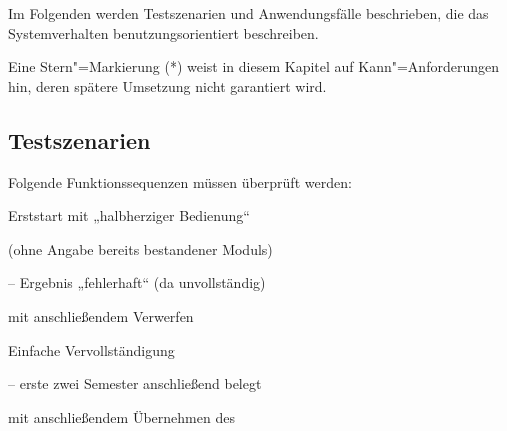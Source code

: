 \newenvironment{tblitemize}{
	\begin{itemize}[nosep,leftmargin=12pt]
}{
	\end{itemize}\hspace{0pt}\vspace{-\baselineskip}
}

\newcommand{\lA}[1]{\label{A#1}A#1}

\newcommand{\refA}[1]{\hyperref[A#1]{/A#1/}}

\newcommand{\opt}{*} 

\newcommand{\case}[1]{\textit{#1}}


Im Folgenden werden Testszenarien und Anwendungsfälle beschrieben, die das Systemverhalten benutzungsorientiert beschreiben.

Eine Stern"=Markierung (\opt) weist in diesem Kapitel auf Kann"=Anforderungen hin, deren spätere Umsetzung nicht garantiert wird.

\subsection{Testszenarien}
Folgende Funktionssequenzen müssen überprüft werden:

\begin{scenario}{Erststart mit „halbherziger Bedienung“}
	\item {} (ohne Angabe bereits bestandener \glspl{Modul})
	\item {}
	\item {} – Ergebnis „fehlerhaft“ (da unvollständig)
	\item {} mit anschließendem Verwerfen
	\item {}
	\item {} 
	\item {}
\end{scenario}

\begin{scenario}{Einfache Vervollständigung}
	\item {}
	\item {} – erste zwei Semester anschließend belegt
	\item {}
	\item {} mit anschließendem Übernehmen des 
	\item {} 
	\item {}
	\item {}
	\item {}
\end{scenario}

